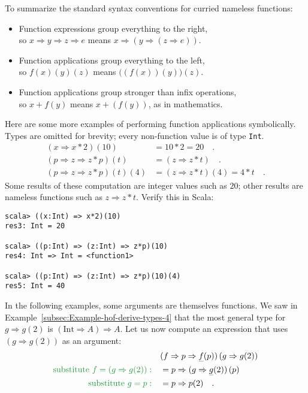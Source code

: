 To summarize the standard syntax conventions for curried nameless
functions:
\begin{itemize}
\item Function expressions group everything to the right,\\
so $x\Rightarrow y\Rightarrow z\Rightarrow e$ means $x\Rightarrow\left(y\Rightarrow\left(z\Rightarrow e\right)\right)$.
\item Function applications group everything to the left,\\
so $f(x)(y)(z)$ means $\big((f(x))(y)\big)(z)$.
\item Function applications group stronger than infix operations,\\
so $x+f(y)$ means $x+(f(y))$, as in mathematics.
\end{itemize}
Here are some more examples of performing function applications symbolically.
Types are omitted for brevity; every non-function value is of type
\texttt{}\lstinline!Int!.
\begin{align*}
\left(x\Rightarrow x*2\right)(10) & =10*2=20\quad.\\
\left(p\Rightarrow z\Rightarrow z*p\right)\left(t\right) & =(z\Rightarrow z*t)\quad.\\
\left(p\Rightarrow z\Rightarrow z*p\right)(t)(4) & =(z\Rightarrow z*t)(4)=4*t\quad.
\end{align*}
Some results of these computation are integer values such as $20$;
other results are nameless functions such as $z\Rightarrow z*t$.
Verify this in Scala:
\begin{lstlisting}
scala> ((x:Int) => x*2)(10)
res3: Int = 20

scala> ((p:Int) => (z:Int) => z*p)(10)
res4: Int => Int = <function1>

scala> ((p:Int) => (z:Int) => z*p)(10)(4)
res5: Int = 40 
\end{lstlisting}
In the following examples, some arguments are themselves functions.
We saw in Example~\ref{subsec:Example-hof-derive-types-4} that the
most general type for $g\Rightarrow g(2)$ is $\left(\text{Int}\Rightarrow A\right)\Rightarrow A$.
Let us now compute an expression that uses $\left(g\Rightarrow g(2)\right)$
as an argument:
\begin{align}
 & (f\Rightarrow p\Rightarrow\gunderline f(p))\left(g\Rightarrow g(2)\right)\nonumber \\
{\color{greenunder}\text{substitute }f=\left(g\Rightarrow g(2)\right):}\quad & =p\Rightarrow(g\Rightarrow\gunderline g(2))\,(p)\nonumber \\
{\color{greenunder}\text{substitute }g=p:}\quad & =p\Rightarrow p(2)\quad.\label{eq:higher-order-functions-derivation1}
\end{align}
